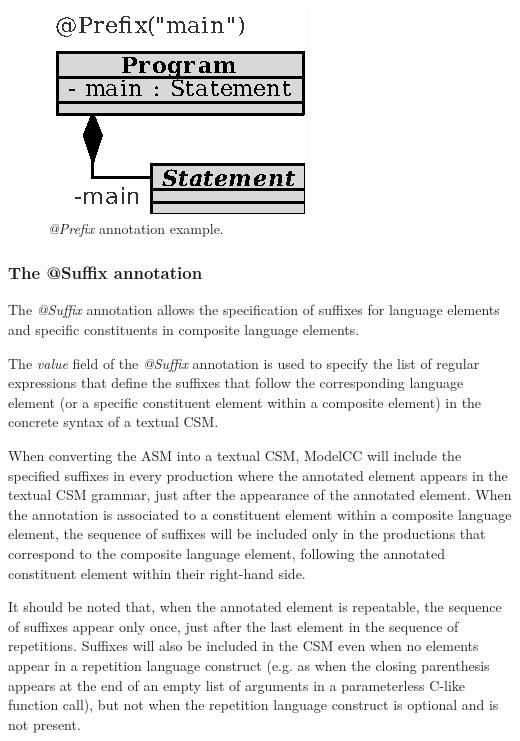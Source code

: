 \documentclass[a4paper,twoside,onecolumn]{article}
\newcommand{\an}[1]{\emph{#1}} %
\begin{document}
\begin{figure}[tb!]
\centering
\includegraphics[scale=1]{programmain.eps}
\caption{\an{@Prefix} annotation example.} \label{fig:programmain}
\end{figure}



\subsubsection{The @Suffix annotation}

The \an{@Suffix} annotation allows the specification of suffixes for language elements and specific constituents in composite language elements.

The \emph{value} field of the \an{@Suffix} annotation is used to specify the list of regular expressions that define the suffixes that follow the corresponding language element (or a specific constituent element within a composite element) in the concrete syntax of a textual CSM.

When converting the ASM into a textual CSM, ModelCC will include the specified suffixes in every production where the annotated element appears in the textual CSM grammar, just after the appearance of the annotated element.
When the annotation is associated to a constituent element within a composite language element, the sequence of suffixes will be included only in the productions that correspond to the composite language element, following the annotated constituent element within their right-hand side.

It should be noted that, when the annotated element is repeatable, the sequence of suffixes appear only once, just after the last element in the sequence of repetitions.
Suffixes will also be included in the CSM even when no elements appear in a repetition language construct (e.g. as when the closing parenthesis appears at the end of an empty list of arguments in a parameterless C-like function call), but not when the repetition language construct is optional and is not present.
\end{document}
